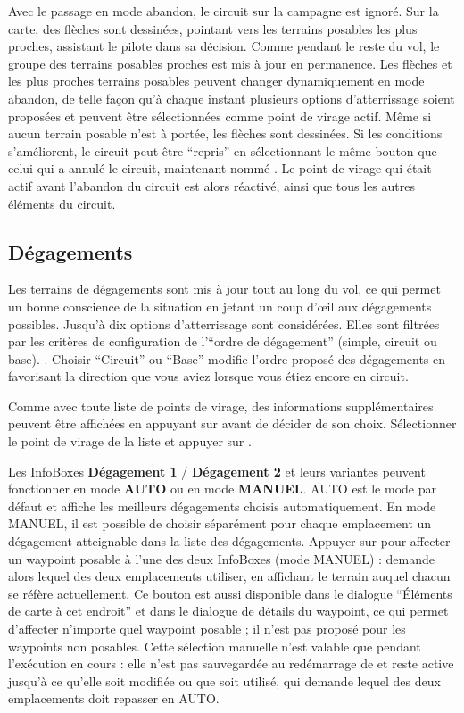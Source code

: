 Avec le passage en mode abandon, le circuit sur la campagne est ignoré. Sur la carte, des flèches
sont dessinées, pointant vers les terrains posables les plus proches,
assistant le pilote dans sa décision. Comme pendant le reste du vol, le groupe des terrains
posables proches est mis à jour en permanence. Les flèches et les plus proches terrains posables peuvent changer
dynamiquement en mode abandon, de telle façon qu'à chaque instant plusieurs options d'atterrissage soient 
proposées et peuvent être sélectionnées comme point de virage actif. Même si aucun
terrain posable n'est à portée, les flèches sont dessinées.
Si les conditions s'améliorent, le circuit peut être ``repris'' en sélectionnant le même
bouton que celui qui a annulé le circuit, maintenant nommé . Le point de virage
qui était actif avant l'abandon du circuit est alors réactivé, ainsi que tous les autres éléments du circuit.

\subsection*{Dégagements}\label{sec:alternates}
Les terrains de dégagements sont mis à jour tout au long du vol, ce qui permet un bonne conscience
de la situation en jetant un coup d'œil aux dégagements possibles. Jusqu'à dix options d'atterrissage
sont considérées. Elles sont filtrées par les critères de configuration de l'``ordre de dégagement''
(simple, circuit ou base). .
Choisir ``Circuit'' ou ``Base'' modifie l'ordre proposé des dégagements en favorisant 
la direction que vous aviez lorsque vous étiez encore en circuit.

Comme avec toute liste de points de virage, des informations supplémentaires peuvent être affichées en appuyant sur  avant de décider de son choix. Sélectionner le point de virage de la liste et appuyer sur .

Les InfoBoxes \textbf{Dégagement 1} / \textbf{Dégagement 2} et leurs variantes
peuvent fonctionner en mode \textbf{AUTO} ou en mode \textbf{MANUEL}. AUTO est
le mode par défaut et affiche les meilleurs dégagements choisis
automatiquement. En mode MANUEL, il est possible de choisir séparément pour
chaque emplacement un dégagement atteignable dans la liste des dégagements.
Appuyer sur  pour affecter un waypoint posable à
l'une des deux InfoBoxes (mode MANUEL) : \xc{} demande alors lequel des deux
emplacements utiliser, en affichant le terrain auquel chacun se réfère
actuellement. Ce bouton est aussi disponible dans le dialogue ``Éléments de
carte à cet endroit'' et dans le dialogue de détails du waypoint, ce qui permet
d'affecter n'importe quel waypoint posable ; il n'est pas proposé pour les
waypoints non posables.
Cette sélection manuelle n'est valable que pendant l'exécution en cours : elle
n'est pas sauvegardée au redémarrage de \xc{} et reste active jusqu'à ce
qu'elle soit modifiée ou que  soit utilisé, qui
demande lequel des deux emplacements doit repasser en AUTO.

